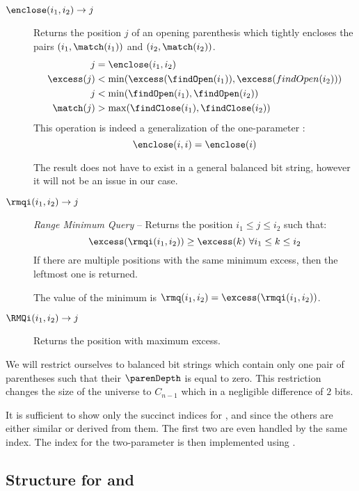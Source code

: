 \begin{description}
	\item[$\enclose(i_1, i_2) \rightarrow j$]
	Returns the position $j$ of an opening parenthesis which tightly encloses the pairs $(i_1, \match(i_1))$ and $(i_2, \match(i_2))$.
	\begin{align*}
		j &= \enclose(i_1, i_2) \\
		\excess(j) &< \min(\excess(\findOpen(i_1)), \excess(findOpen(i_2))) \\
		j &< \min(\findOpen(i_1), \findOpen(i_2)) \\
		\match(j) &> \max(\findClose(i_1), \findClose(i_2))
	\end{align*}
	This operation is indeed a generalization of the one-parameter \enclose{}:
	$$\enclose(i, i) = \enclose(i)$$
	
	The result does not have to exist in a general balanced bit string, however it will not be an issue in our case.
	
	\item[$\rmqi(i_1, i_2) \rightarrow j$]
	\emph{Range Minimum Query} -- Returns the position $i_1 \le j \le i_2$ such that: 
	$$\excess(\rmqi(i_1, i_2)) \ge \excess(k) \ \forall i_1 \le k \le i_2$$
	If there are multiple positions with the same minimum excess, then the leftmost one is returned.
	
	The value of the minimum is $\rmq(i_1, i_2) = \excess(\rmqi(i_1, i_2))$.
	
	\item[$\RMQi(i_1, i_2) \rightarrow j$]
	Returns the position with maximum excess.
\end{description}

We will restrict ourselves to balanced bit strings which contain only one pair of parentheses such that their $\parenDepth$ is equal to zero.
This restriction changes the size of the universe to $C_{n-1}$ which in a negligible difference of $2$ bits.

\bigbreak

It is sufficient to show only the succinct indices for \findClose{}, \enclose{} and \rmqi{} since the others are either similar or derived from them.
The first two are even handled by the same index.
The index for the two-parameter \enclose{} is then implemented using \rmqi.

\subsection{Structure for \match{} and \enclose{}}\label{s:match-enclose}

